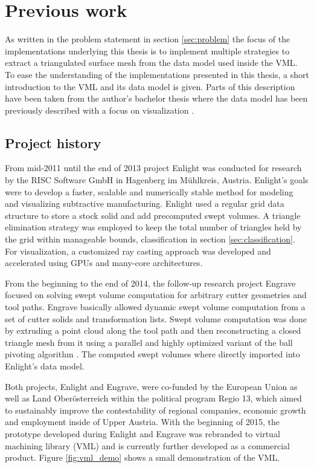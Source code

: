 \chapter{Previous work}
\label{ch:previous_work}

As written in the problem statement in section \ref{sec:problem} the focus of the implementations underlying this thesis is to implement multiple strategies to extract a triangulated surface mesh from the data model used inside the VML.
To ease the understanding of the implementations presented in this thesis, a short introduction to the VML and its data model is given.
Parts of this description have been taken from the author's bachelor thesis where the data model has been previously described with a focus on visualization \cite{bachelor}.

\section{Project history}
\label{sec:project_history}

From mid-2011 until the end of 2013 project Enlight was conducted for research by the RISC Software GmbH in Hagenberg im Mühlkreis, Austria.
Enlight's goals were to develop a faster, scalable and numerically stable method for modeling and visualizing subtractive manufacturing.
Enlight used a regular grid data structure to store a stock solid and add precomputed swept volumes.
A triangle elimination strategy was employed to keep the total number of triangles held by the grid within manageable bounds, \cf classification in section \ref{sec:classification}.
For visualization, a customized ray casting approach was developed \cite{enlight} and accelerated using GPUs and many-core architectures.

From the beginning to the end of 2014, the follow-up research project Engrave focused on solving swept volume computation for arbitrary cutter geometries and tool paths.
Engrave basically allowed dynamic swept volume computation from a set of cutter solids and transformation lists.
Swept volume computation was done by extruding a point cloud along the tool path and then reconstructing a closed triangle mesh from it using a parallel and highly optimized variant of the ball pivoting algorithm \cite{engrave}.
The computed swept volumes where directly imported into Enlight's data model.

Both projects, Enlight and Engrave, were co-funded by the European Union as well as Land Oberösterreich within the political program Regio 13, which aimed to sustainably improve the contestability of regional companies, economic growth and employment inside of Upper Austria.
%
With the beginning of 2015, the prototype developed during Enlight and Engrave was rebranded to virtual machining library (VML) and is currently further developed as a commercial product.
Figure \ref{fig:vml_demo} shows a small demonstration of the VML.

